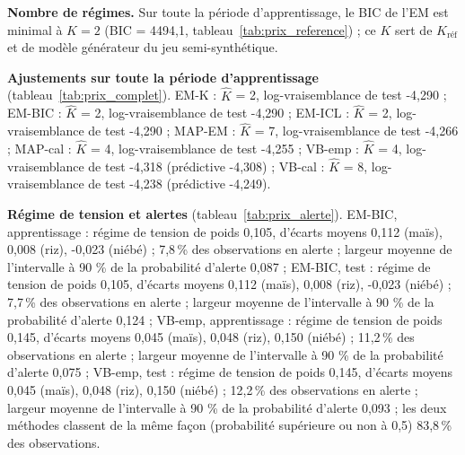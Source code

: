 \textbf{Nombre de régimes.} Sur toute la période d'apprentissage, le BIC de l'EM est minimal à $K = 2$ (BIC = 4494,1, tableau~\ref{tab:prix_reference}) ; ce $K$ sert de $K_{\text{réf}}$ et de modèle générateur du jeu semi-synthétique.

\textbf{Ajustements sur toute la période d'apprentissage} (tableau~\ref{tab:prix_complet}). EM-K : $\hat K$ = 2, log-vraisemblance de test -4,290 ; EM-BIC : $\hat K$ = 2, log-vraisemblance de test -4,290 ; EM-ICL : $\hat K$ = 2, log-vraisemblance de test -4,290 ; MAP-EM : $\hat K$ = 7, log-vraisemblance de test -4,266 ; MAP-cal : $\hat K$ = 4, log-vraisemblance de test -4,255 ; VB-emp : $\hat K$ = 4, log-vraisemblance de test -4,318 (prédictive -4,308) ; VB-cal : $\hat K$ = 8, log-vraisemblance de test -4,238 (prédictive -4,249).

\textbf{Régime de tension et alertes} (tableau~\ref{tab:prix_alerte}). EM-BIC, apprentissage : régime de tension de poids 0,105, d'écarts moyens 0,112 (maïs), 0,008 (riz), -0,023 (niébé) ; 7,8\,\% des observations en alerte ; largeur moyenne de l'intervalle à 90 \% de la probabilité d'alerte 0,087 ; EM-BIC, test : régime de tension de poids 0,105, d'écarts moyens 0,112 (maïs), 0,008 (riz), -0,023 (niébé) ; 7,7\,\% des observations en alerte ; largeur moyenne de l'intervalle à 90 \% de la probabilité d'alerte 0,124 ; VB-emp, apprentissage : régime de tension de poids 0,145, d'écarts moyens 0,045 (maïs), 0,048 (riz), 0,150 (niébé) ; 11,2\,\% des observations en alerte ; largeur moyenne de l'intervalle à 90 \% de la probabilité d'alerte 0,075 ; VB-emp, test : régime de tension de poids 0,145, d'écarts moyens 0,045 (maïs), 0,048 (riz), 0,150 (niébé) ; 12,2\,\% des observations en alerte ; largeur moyenne de l'intervalle à 90 \% de la probabilité d'alerte 0,093 ; les deux méthodes classent de la même façon (probabilité supérieure ou non à 0,5) 83,8\,\% des observations.
